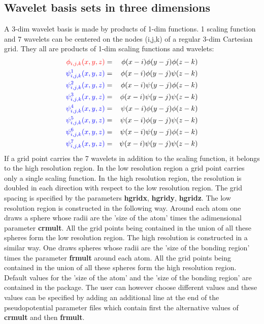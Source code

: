 \documentclass[a4paper,11pt]{report}
\begin{document}
\subsection{Wavelet basis sets in three dimensions}
A 3-dim wavelet basis is made by products of 1-dim functions.
 {\color{red} 1  scaling function} and {\color{blue} 7 wavelets} 
can be centered on the nodes (i,j,k) of a regular 3-dim Cartesian grid.
They all are products of 1-dim scaling functions and wavelets:
\begin{eqnarray*}
 {\color{red} \phi_{i,j,k}(x,y,z) }  & = & \phi(x-i) \phi(y-j) \phi(z-k)   \\
 {\color{blue} \psi^1_{i,j,k}(x,y,z) } & = & \phi(x-i) \phi(y-j) \psi(z-k)  \\
 {\color{blue} \psi^2_{i,j,k}(x,y,z) } & = & \phi(x-i) \psi(y-j) \phi(z-k)  \\
 {\color{blue} \psi^3_{i,j,k}(x,y,z) } & = & \phi(x-i) \psi(y-j) \psi(z-k)  \\
 {\color{blue} \psi^4_{i,j,k}(x,y,z) } & = & \psi(x-i) \phi(y-j) \phi(z-k)  \\
 {\color{blue} \psi^5_{i,j,k}(x,y,z) } & = & \psi(x-i) \phi(y-j) \psi(z-k)  \\
 {\color{blue} \psi^6_{i,j,k}(x,y,z) } & = & \psi(x-i) \psi(y-j) \phi(z-k)  \\
 {\color{blue} \psi^7_{i,j,k}(x,y,z) } & = & \psi(x-i) \psi(y-j) \psi(z-k)  \\
\end{eqnarray*}
If a grid point carries the 7 {\color{blue} wavelets} in addition to the {\color{red} scaling function}, it belongs 
to the high resolution region. In the low resolution region a grid point carries only 
a single {\color{red} scaling function}. In the high resolution region, the resolution is doubled 
in each direction with respect to the low resolution region. The grid spacing is specified by the parameters
{\bf hgridx}, {\bf hgridy}, {\bf hgridz}. The low resolution region is constructed in the following way. Around each 
atom one draws a sphere whose radii are the 'size of the atom' times the adimensional parameter {\bf crmult}. All the grid 
points being contained in the union of all these spheres form the low resolution region. The high resolution is 
constructed in a similar way. One draws spheres whose radii are the 'size of the bonding region' times the 
parameter {\bf frmult} around each atom.  All the grid points being contained in the union of all these spheres 
form the high resolution region. Default values for the 'size of the atom' and  the 'size of the bonding region' 
are contained in the package. The user can however choose different values and these values can be specified by 
adding an additional line at the end of the pseudopotential parameter files which contain first the alternative 
values of {\bf crmult} and then {\bf frmult}.
\end{document}
